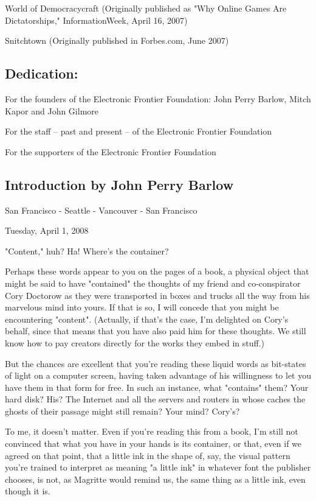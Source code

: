 World of Democracycraft (Originally published as "Why Online Games
Are Dictatorships," InformationWeek, April 16, 2007)

Snitchtown (Originally published in Forbes.com, June 2007)

\subsection{Dedication:}

For the founders of the Electronic Frontier Foundation: John Perry
Barlow, Mitch Kapor and John Gilmore

For the staff -- past and present -- of the Electronic Frontier
Foundation

For the supporters of the Electronic Frontier Foundation

\subsection{Introduction by John Perry Barlow}

San Francisco - Seattle - Vancouver - San Francisco

Tuesday, April 1, 2008

"Content," huh? Ha! Where's the container?

Perhaps these words appear to you on the pages of a book, a
physical object that might be said to have "contained" the thoughts
of my friend and co-conspirator Cory Doctorow as they were
transported in boxes and trucks all the way from his marvelous mind
into yours. If that is so, I will concede that you might be
encountering "content". (Actually, if that's the case, I'm
delighted on Cory's behalf, since that means that you have also
paid him for these thoughts. We still know how to pay creators
directly for the works they embed in stuff.)

But the chances are excellent that you're reading these liquid
words as bit-states of light on a computer screen, having taken
advantage of his willingness to let you have them in that form for
free. In such an instance, what "contains" them? Your hard disk?
His? The Internet and all the servers and routers in whose caches
the ghosts of their passage might still remain? Your mind? Cory's?

To me, it doesn't matter. Even if you're reading this from a book,
I'm still not convinced that what you have in your hands is its
container, or that, even if we agreed on that point, that a little
ink in the shape of, say, the visual pattern you're trained to
interpret as meaning "a little ink" in whatever font the publisher
chooses, is not, as Magritte would remind us, the same thing as a
little ink, even though it is.

